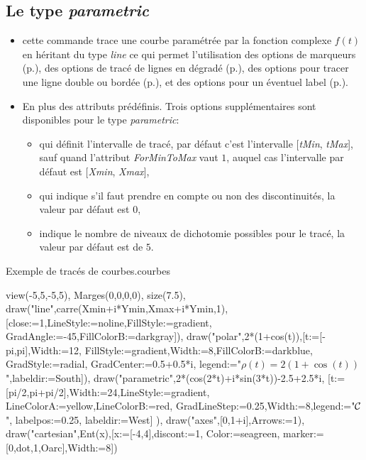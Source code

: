 \subsection{Le type \emph{parametric}}

{\centering {}\par}

\begin{itemize}
 \item \desc cette commande trace une courbe paramétrée par la fonction complexe $f(t)$ en héritant du type \emph{line} ce qui permet l'utilisation des options de marqueurs (p.\pageref{marqueurs}), des options de tracé de lignes en dégradé (p.\pageref{gradLines}), des options pour tracer une ligne double ou bordée (p.\pageref{optionsline}), et des options pour un éventuel label (p.\pageref{optionslabels}).
 \item En plus des attributs prédéfinis. Trois options supplémentaires sont disponibles pour le type \emph{parametric}:\label{parametric}
  \begin{itemize}
  \item {} qui définit l'intervalle de tracé, par défaut c'est l'intervalle [\emph{tMin}, \emph{tMax}], sauf quand l'attribut \textit{ForMinToMax} vaut $1$, auquel cas l'intervalle par défaut est [\emph{Xmin}, \emph{Xmax}], 
  \item {} qui indique s'il faut prendre en compte ou non des discontinuités, la valeur par défaut est $0$,
  \item {} indique le nombre de niveaux de dichotomie possibles pour le tracé, la valeur par défaut est de $5$.
  \end{itemize}
\end{itemize}


\begin{demo}{Exemple de tracés de courbes.}{courbes}
\begin{texgraph}[name=courbes]
view(-5,5,-5,5), Marges(0,0,0,0), size(7.5),
draw("line",carre(Xmin+i*Ymin,Xmax+i*Ymin,1),
 [close:=1,LineStyle:=noline,FillStyle:=gradient,
 GradAngle:=-45,FillColorB:=darkgray]),
draw("polar",2*(1+cos(t)),[t:=[-pi,pi],Width:=12,
 FillStyle:=gradient,Width:=8,FillColorB:=darkblue,
 GradStyle:=radial, GradCenter:=0.5+0.5*i,
 legend:="$\rho(t)=2(1+\cos(t))$",labeldir:=South]),
draw("parametric",2*(cos(2*t)+i*sin(3*t))-2.5+2.5*i,
 [t:=[pi/2,pi+pi/2],Width:=24,LineStyle:=gradient,
 LineColorA:=yellow,LineColorB:=red,
 GradLineStep:=0.25,Width:=8,legend:="$\cal C$",
 labelpos:=0.25, labeldir:=West] ),
draw("axes",[0,1+i],Arrows:=1),
draw("cartesian",Ent(x),[x:=[-4,4],discont:=1,
 Color:=seagreen, marker:=[0,dot,1,Oarc],Width:=8])
\end{texgraph}
\end{demo}


